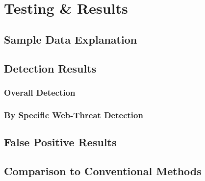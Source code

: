 \chapter{Testing \& Results}

\section{Sample Data Explanation}

\section{Detection Results}

\subsection{Overall Detection}
\subsection{By Specific Web-Threat Detection} 

\section{False Positive Results}

\section{Comparison to Conventional Methods}
